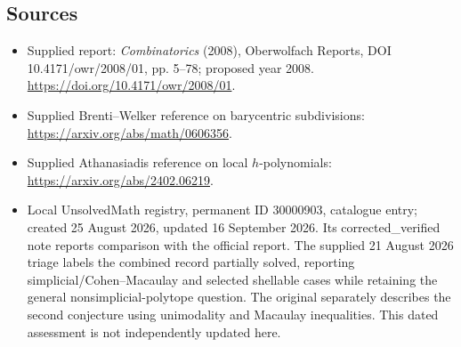 \documentclass[11pt]{article}
\begin{document}
\subsection{Sources}
\begin{itemize}
\item Supplied report: \emph{Combinatorics} (2008), Oberwolfach Reports, DOI 10.4171/owr/2008/01, pp. 5--78; proposed year 2008. \url{https://doi.org/10.4171/owr/2008/01}.
\item Supplied Brenti--Welker reference on barycentric subdivisions: \url{https://arxiv.org/abs/math/0606356}.
\item Supplied Athanasiadis reference on local $h$-polynomials: \url{https://arxiv.org/abs/2402.06219}.
\item Local UnsolvedMath registry, permanent ID 30000903, catalogue entry; created 25 August 2026, updated 16 September 2026. Its corrected\_verified note reports comparison with the official report. The supplied 21 August 2026 triage labels the combined record partially solved, reporting simplicial/Cohen--Macaulay and selected shellable cases while retaining the general nonsimplicial-polytope question. The original separately describes the second conjecture using unimodality and Macaulay inequalities. This dated assessment is not independently updated here.
\end{itemize}
\end{document}
